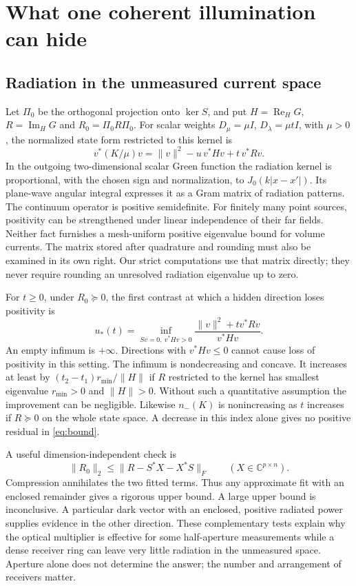 \documentclass[anonymous,12pt]{iopjournal}
\theoremstyle{remark}\newtheorem{remark}[theorem]{Remark}
\newcommand{\C}{\mathbb C}\newcommand{\R}{\mathbb R}
\newcommand{\Herm}{\operatorname{Re}_{\!H}}\newcommand{\Imag}{\operatorname{Im}_{\!H}}
\numberwithin{equation}{section}
\begin{document}
\section{What one coherent illumination can hide}\label{sec:single}

\subsection{Radiation in the unmeasured current space}
Let $\Pi_0$ be the orthogonal projection onto $\ker S$, and put $H=\Herm G$, $R=\Imag G$ and $R_0=\Pi_0R\Pi_0$. For scalar weights $D_\mu=\mu I$, $D_\lambda=\mu t I$, with $\mu>0$, the normalized state form restricted to this kernel is
\begin{equation}
 v^*(K/\mu)v=\|v\|^2-u\,v^*Hv+t\,v^*Rv.\label{eq:dark}
\end{equation}
In the outgoing two-dimensional scalar Green function the radiation kernel is proportional, with the chosen sign and normalization, to $J_0(k|x-x'|)$. Its plane-wave angular integral expresses it as a Gram matrix of radiation patterns. The continuum operator is positive semidefinite. For finitely many point sources, positivity can be strengthened under linear independence of their far fields. Neither fact furnishes a mesh-uniform positive eigenvalue bound for volume currents. The matrix stored after quadrature and rounding must also be examined in its own right. Our strict computations use that matrix directly; they never require rounding an unresolved radiation eigenvalue up to zero.

For $t\ge0$, under $R_0\succeq0$, the first contrast at which a hidden direction loses positivity is
\begin{equation}
 u_*(t)=\inf_{Sv=0,\ v^*Hv>0}
             \frac{\|v\|^2+t v^*Rv}{v^*Hv}.\label{eq:threshold}
\end{equation}
An empty infimum is $+\infty$. Directions with $v^*Hv\le0$ cannot cause loss of positivity in this setting. The infimum is nondecreasing and concave. It increases at least by $(t_2-t_1)r_{\min}/\|H\|$ if $R$ restricted to the kernel has smallest eigenvalue $r_{\min}>0$ and $\|H\|>0$. Without such a quantitative assumption the improvement can be negligible. Likewise $n_-(K)$ is nonincreasing as $t$ increases if $R\succeq0$ on the whole state space. A decrease in this index alone gives no positive residual in \eqref{eq:bound}.

A useful dimension-independent check is
\begin{equation}
 \|R_0\|_2\le \|R-S^*X-X^*S\|_F\qquad(X\in\C^{p\times n}).\label{eq:radupper}
\end{equation}
Compression annihilates the two fitted terms. Thus any approximate fit with an enclosed remainder gives a rigorous upper bound. A large upper bound is inconclusive. A particular dark vector with an enclosed, positive radiated power supplies evidence in the other direction. These complementary tests explain why the optical multiplier is effective for some half-aperture measurements while a dense receiver ring can leave very little radiation in the unmeasured space. Aperture alone does not determine the answer; the number and arrangement of receivers matter.
\end{document}
